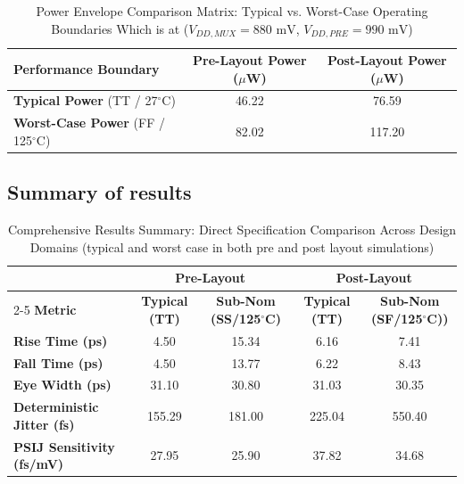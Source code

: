 \begin{table}[H]
    \centering
    \renewcommand{\arraystretch}{1.3}
    \setlength{\tabcolsep}{14pt}
    \small
    \begin{tabular}{|l|c|c|}
        \hline
        \textbf{Performance Boundary} & \textbf{Pre-Layout Power ($\mu$W)} & \textbf{Post-Layout Power ($\mu$W)} \\ \hline
        \textbf{Typical Power} (TT / 27$^{\circ}\text{C}$) & 46.22 & 76.59 \\ \hline
        \textbf{Worst-Case Power} (FF / 125$^{\circ}\text{C}$) & 82.02 & 117.20 \\ \hline
    \end{tabular}
    \vspace{2mm}
    \caption{Power Envelope Comparison Matrix: Typical vs. Worst-Case Operating Boundaries Which is at ($V_{DD,MUX} = 880\text{ mV}$, $V_{DD,PRE} = 990\text{ mV}$)}
    \label{tab:direct_pvt_power_comparison}
\end{table}


\subsection{Summary of results}
\begin{table}[H]
    \centering
    \renewcommand{\arraystretch}{1.3}
    \setlength{\tabcolsep}{7pt}
    \small
    \begin{tabular}{|l|cc|cc|}
        \hline
        & \multicolumn{2}{c|}{\textbf{Pre-Layout}} & \multicolumn{2}{c|}{\textbf{Post-Layout}} \\ \cline{2-5}
        \textbf{Metric} & \textbf{Typical (TT)} & \textbf{Sub-Nom (SS/125$^{\circ}$C)} & \textbf{Typical (TT)} & \textbf{Sub-Nom (SF/125$^{\circ}$C))} \\ \hline
        \hline
        \textbf{Rise Time (ps)} & 4.50 & 15.34 & 6.16 & 7.41 \\ \hline
        \textbf{Fall Time (ps)} & 4.50 & 13.77 & 6.22 & 8.43 \\ \hline
        \textbf{Eye Width (ps)} & 31.10 & 30.80 & 31.03 & 30.35 \\ \hline
        \textbf{Deterministic Jitter (fs)} & 155.29 & 181.00 & 225.04 & 550.40 \\ \hline
        \textbf{PSIJ Sensitivity (fs/mV)} & 27.95 & 25.90 & 37.82 & 34.68 \\ \hline
    \end{tabular}
    \vspace{2mm}
    \caption{Comprehensive Results Summary: Direct Specification Comparison Across  Design Domains (typical and worst case in both pre and post layout simulations)}
    \label{tab:final_results_summary_full}
\end{table}

